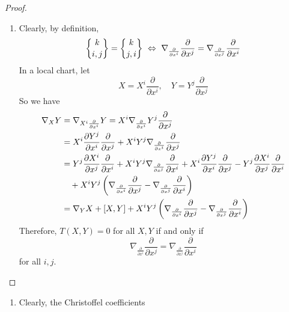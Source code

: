 \begin{enumerate}[label=\arabic{*}.]
\begin{proof}
\begin{enumerate}[label=(\arabic{*})]
			\item Clearly, by definition,
			\begin{equation*}
				\bracenom{k}{i,j}=\bracenom{k}{j,i} ~\Leftrightarrow~ \nabla_{\frac{\partial}{\partial x^i}}\frac{\partial}{\partial x^j} = \nabla_{\frac{\partial}{\partial x^j}}\frac{\partial}{\partial x^i}
			\end{equation*}
			In a local chart, let
			\begin{equation*}
				X = X^i\frac{\partial}{\partial x^i},\quad Y = Y^j\frac{\partial}{\partial x^j}
			\end{equation*}
			So we have
			\begin{equation*}
				\begin{aligned}
					\nabla_XY &= \nabla_{X^i\frac{\partial}{\partial x^i}}Y = X^i\nabla_{\frac{\partial}{\partial x^i}}Y^j\frac{\partial}{\partial x^j} \\
					&= X^i\frac{\partial Y^j}{\partial x^i}\frac{\partial}{\partial x^j} +X^iY^j\nabla_{\frac{\partial}{\partial x^i}}\frac{\partial}{\partial x^j} \\
					&= Y^j\frac{\partial X^i}{\partial x^j}\frac{\partial}{\partial x^i} +X^iY^j\nabla_{\frac{\partial}{\partial x^j}}\frac{\partial}{\partial x^i} +X^i\frac{\partial Y^j}{\partial x^i}\frac{\partial}{\partial x^j} - Y^j\frac{\partial X^i}{\partial x^j}\frac{\partial}{\partial x^i}\\
					&\quad +  X^iY^j\left(\nabla_{\frac{\partial}{\partial x^i}}\frac{\partial}{\partial x^j} - \nabla_{\frac{\partial}{\partial x^j}}\frac{\partial}{\partial x^i}\right) \\
					&= \nabla_YX + [X,Y] + X^iY^j\left(\nabla_{\frac{\partial}{\partial x^i}}\frac{\partial}{\partial x^j} - \nabla_{\frac{\partial}{\partial x^j}}\frac{\partial}{\partial x^i}\right)
				\end{aligned}
			\end{equation*}
			Therefore, $T(X,Y) = 0$ for all $X,Y$ if and only if
			\begin{equation*}
				\nabla_{\frac{\partial}{\partial x^i}}\frac{\partial}{\partial x^j} = \nabla_{\frac{\partial}{\partial x^j}}\frac{\partial}{\partial x^i}
			\end{equation*}
			for all $i,j$. \qedhere
		\end{enumerate}
	\end{proof}
	\begin{rmk}
		\begin{enumerate}[label=(\roman{*})]
			\item Clearly, the Christoffel coefficients

\end{enumerate}
\end{rmk}
\end{enumerate}
